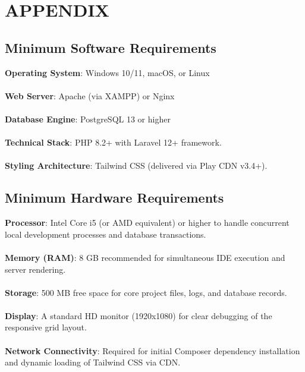 \chapter{APPENDIX}

\section{Minimum Software Requirements}
\medskip
\textbf{Operating System}: Windows 10/11, macOS, or Linux
\\\\
\textbf{Web Server}: Apache (via XAMPP) or Nginx
\\\\
\textbf{Database Engine}: PostgreSQL 13 or higher
\\\\
\textbf{Technical Stack}: PHP 8.2+ with Laravel 12+ framework.
\\\\
\textbf{Styling Architecture}: Tailwind CSS (delivered via Play CDN v3.4+).

\section{Minimum Hardware Requirements}
\textbf{Processor}: Intel Core i5 (or AMD equivalent) or higher to handle concurrent local development processes and database transactions.
\\\\
\textbf{Memory (RAM)}: 8 GB recommended for simultaneous IDE execution and server rendering.
\\\\
\textbf{Storage}: 500 MB free space for core project files, logs, and database records.
\\\\
\textbf{Display}: A standard HD monitor (1920x1080) for clear debugging of the responsive grid layout.
\\\\
\textbf{Network Connectivity}: Required for initial Composer dependency installation and dynamic loading of Tailwind CSS via CDN.
